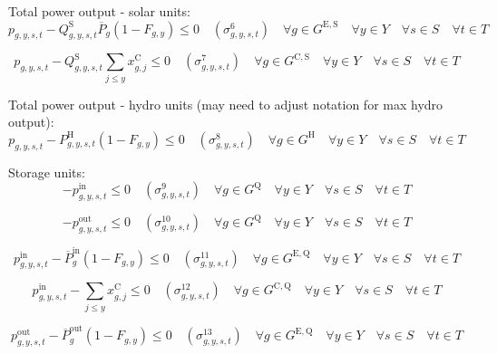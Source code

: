 \documentclass{article}
\newcommand{\sGeneratorsExistingSolar}{G^{\mathrm{E,S}}}
\newcommand{\sGeneratorsCandidateSolar}{G^{\mathrm{C,S}}}
\newcommand{\sGeneratorsHydro}{G^{\mathrm{H}}}
\newcommand{\sStorage}{G^{\mathrm{Q}}}
\newcommand{\sStorageExisting}{G^{\mathrm{E,Q}}}
\newcommand{\sStorageCandidate}{G^{\mathrm{C,Q}}}
\newcommand{\sYears}{Y}
\newcommand{\sScenarios}{S}
\newcommand{\sIntervals}{T}
\newcommand{\iGenerator}{g}
\newcommand{\iYear}{y}
\newcommand{\iYearAlias}{j}
\newcommand{\iScenario}{s}
\newcommand{\iInterval}{t}
\newcommand{\cPowerOutputMax}[1][\iGenerator,\iYear]{\overline{P}_{#1}}
\newcommand{\cCapacityFactorSolar}[1][\iGenerator,\iYear,\iScenario,\iInterval]{Q_{#1}^{\mathrm{S}}}
\newcommand{\cPowerChargingMax}[1][\iGenerator]{\overline{P}^{\mathrm{in}}_{#1}}
\newcommand{\cPowerDischargingMax}[1][\iGenerator]{\overline{P}^{\mathrm{out}}_{#1}}
\newcommand{\cRetirementIndicator}[1][\iGenerator,\iYear]{F_{#1}}
\newcommand{\cPowerOutputHydro}[1][\iGenerator,\iYear,\iScenario,\iInterval]{P^{\mathrm{H}}_{#1}}
\newcommand{\vInstalledCapacity}[1][\iGenerator,\iYear]{x^{\mathrm{C}}_{#1}}
\newcommand{\vPower}[1][\iGenerator,\iYear,\iScenario,\iInterval]{p_{#1}}
\newcommand{\vPowerIn}[1][\iGenerator,\iYear,\iScenario,\iInterval]{p^{\mathrm{in}}_{#1}}
\newcommand{\vPowerOut}[1][\iGenerator,\iYear,\iScenario,\iInterval]{p^{\mathrm{out}}_{#1}}
\newcommand{\dMaxPowerOutputSolarExisting}[1][\iGenerator,\iYear,\iScenario,\iInterval]{\sigma_{#1}^{6}}
\newcommand{\dMaxPowerOutputSolarCandidate}[1][\iGenerator,\iYear,\iScenario,\iInterval]{\sigma_{#1}^{7}}
\newcommand{\dMaxPowerOutputHydro}[1][\iGenerator,\iYear,\iScenario,\iInterval]{\sigma_{#1}^{8}}
\newcommand{\dNonNegativeCharging}[1][\iGenerator,\iYear,\iScenario,\iInterval]{\sigma_{#1}^{9}}
\newcommand{\dNonNegativeDischarging}[1][\iGenerator,\iYear,\iScenario,\iInterval]{\sigma_{#1}^{10}}
\newcommand{\dMaxChargingRateExisting}[1][\iGenerator,\iYear,\iScenario,\iInterval]{\sigma_{#1}^{11}}
\newcommand{\dMaxChargingRateCandidate}[1][\iGenerator,\iYear,\iScenario,\iInterval]{\sigma_{#1}^{12}}
\newcommand{\dMaxDischargingRateExisting}[1][\iGenerator,\iYear,\iScenario,\iInterval]{\sigma_{#1}^{13}}
\newcommand{\sScenarioSets}{\quad \forall \iYear \in \sYears \quad \forall \iScenario \in \sScenarios \quad \forall \iInterval \in \sIntervals}
\begin{document}
Total power output - solar units:
\begin{equation}
	\vPower - \cCapacityFactorSolar \cPowerOutputMax[\iGenerator] \left(1 - \cRetirementIndicator\right) \leq 0 \quad (\dMaxPowerOutputSolarExisting) \quad \forall \iGenerator \in \sGeneratorsExistingSolar \sScenarioSets
\end{equation}

\begin{equation}
	\vPower - \cCapacityFactorSolar \sum\limits_{\iYearAlias \leq \iYear} \vInstalledCapacity[\iGenerator,\iYearAlias] \leq 0 \quad (\dMaxPowerOutputSolarCandidate) \quad \forall \iGenerator \in \sGeneratorsCandidateSolar \sScenarioSets
\end{equation}

Total power output - hydro units (may need to adjust notation for max hydro output):
\begin{equation}
	\vPower - \cPowerOutputHydro \left(1 - \cRetirementIndicator\right) \leq 0 \quad (\dMaxPowerOutputHydro) \quad \forall \iGenerator \in \sGeneratorsHydro \sScenarioSets
\end{equation}

Storage units:
\begin{equation}
	-\vPowerIn \leq 0 \quad (\dNonNegativeCharging) \quad \forall \iGenerator \in \sStorage \sScenarioSets
\end{equation}

\begin{equation}
	-\vPowerOut \leq 0 \quad (\dNonNegativeDischarging) \quad \forall \iGenerator \in \sStorage \sScenarioSets
\end{equation}

\begin{equation}
	\vPowerIn - \cPowerChargingMax \left(1 - \cRetirementIndicator\right) \leq 0 \quad (\dMaxChargingRateExisting) \quad \forall \iGenerator \in \sStorageExisting \sScenarioSets
\end{equation}

\begin{equation}
	\vPowerIn - \sum\limits_{\iYearAlias \leq \iYear} \vInstalledCapacity[\iGenerator,\iYearAlias] \leq 0 \quad (\dMaxChargingRateCandidate) \quad \forall \iGenerator \in \sStorageCandidate \sScenarioSets
\end{equation}

\begin{equation}
	\vPowerOut - \cPowerDischargingMax \left(1 - \cRetirementIndicator\right) \leq 0 \quad (\dMaxDischargingRateExisting) \quad \forall \iGenerator \in \sStorageExisting \sScenarioSets
\end{equation}
\end{document}
